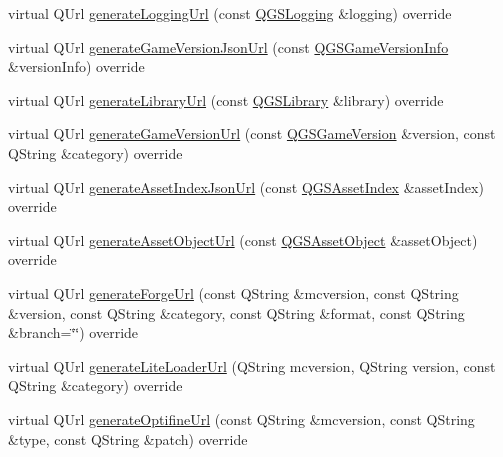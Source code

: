\begin{DoxyCompactItemize}
\item 
virtual Q\+Url \mbox{\hyperlink{class_q_g_s_official_download_source_a83a502b4513eb1286bc97a863ddf980c}{generate\+Logging\+Url}} (const \mbox{\hyperlink{class_q_g_s_logging}{Q\+G\+S\+Logging}} \&logging) override
\item 
virtual Q\+Url \mbox{\hyperlink{class_q_g_s_official_download_source_a591dd8ed6bbfab644b815c75f7d0710c}{generate\+Game\+Version\+Json\+Url}} (const \mbox{\hyperlink{class_q_g_s_game_version_info}{Q\+G\+S\+Game\+Version\+Info}} \&version\+Info) override
\item 
virtual Q\+Url \mbox{\hyperlink{class_q_g_s_official_download_source_a07d41c6aed39acc0cdc071b374ce04bc}{generate\+Library\+Url}} (const \mbox{\hyperlink{class_q_g_s_library}{Q\+G\+S\+Library}} \&library) override
\item 
virtual Q\+Url \mbox{\hyperlink{class_q_g_s_official_download_source_acb74743d3cdc6c2211e56aa0e5b16b93}{generate\+Game\+Version\+Url}} (const \mbox{\hyperlink{class_q_g_s_game_version}{Q\+G\+S\+Game\+Version}} \&version, const Q\+String \&category) override
\item 
virtual Q\+Url \mbox{\hyperlink{class_q_g_s_official_download_source_a67b08e7a797211563db49c3357631c46}{generate\+Asset\+Index\+Json\+Url}} (const \mbox{\hyperlink{class_q_g_s_asset_index}{Q\+G\+S\+Asset\+Index}} \&asset\+Index) override
\item 
virtual Q\+Url \mbox{\hyperlink{class_q_g_s_official_download_source_a06f16b9134010980f1403caecc22a9af}{generate\+Asset\+Object\+Url}} (const \mbox{\hyperlink{class_q_g_s_asset_object}{Q\+G\+S\+Asset\+Object}} \&asset\+Object) override
\item 
virtual Q\+Url \mbox{\hyperlink{class_q_g_s_official_download_source_a212e5a145ed60ce8868069d2e09a4d59}{generate\+Forge\+Url}} (const Q\+String \&mcversion, const Q\+String \&version, const Q\+String \&category, const Q\+String \&format, const Q\+String \&branch=\char`\"{}\char`\"{}) override
\item 
virtual Q\+Url \mbox{\hyperlink{class_q_g_s_official_download_source_a78f454b773647b61aa748f5be9b10ba1}{generate\+Lite\+Loader\+Url}} (Q\+String mcversion, Q\+String version, const Q\+String \&category) override
\item 
virtual Q\+Url \mbox{\hyperlink{class_q_g_s_official_download_source_a0bcd5b86c818cdd76195e16ccddb23da}{generate\+Optifine\+Url}} (const Q\+String \&mcversion, const Q\+String \&type, const Q\+String \&patch) override
\end{DoxyCompactItemize}


